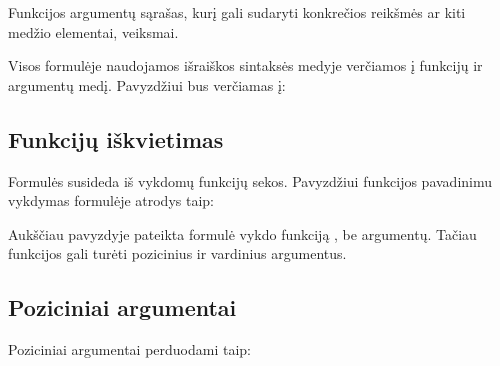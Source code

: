 \documentclass[letterpaper,10pt,lithuanian]{sphinxmanual}
\begin{document}
\begin{fulllineitems}

\pysigstartsignatures
{}
\pysigstopsignatures
\sphinxAtStartPar
Funkcijos argumentų sąrašas, kurį gali sudaryti konkrečios reikšmės ar kiti
medžio elementai, veiksmai.

\end{fulllineitems}


\sphinxAtStartPar
Visos formulėje naudojamos išraiškos sintaksės medyje verčiamos į funkcijų ir
argumentų medį. Pavyzdžiui  bus verčiamas į:

\begin{sphinxVerbatim}[commandchars=\\\{\}]
     
     \PYG{p}{[} \PYG{p}{]}
\end{sphinxVerbatim}


\subsection{Funkcijų iškvietimas}
\label{\detokenize{formules:funkciju-iskvietimas}}
\sphinxAtStartPar
Formulės susideda iš vykdomų funkcijų sekos. Pavyzdžiui funkcijos pavadinimu
 vykdymas formulėje atrodys taip:

\begin{sphinxVerbatim}[commandchars=\\\{\}]
\end{sphinxVerbatim}

\sphinxAtStartPar
Aukščiau pavyzdyje pateikta formulė vykdo funkciją , be argumentų. Tačiau
funkcijos gali turėti pozicinius ir vardinius argumentus.


\subsection{Poziciniai argumentai}
\label{\detokenize{formules:poziciniai-argumentai}}
\sphinxAtStartPar
Poziciniai argumentai perduodami taip:
\end{document}
